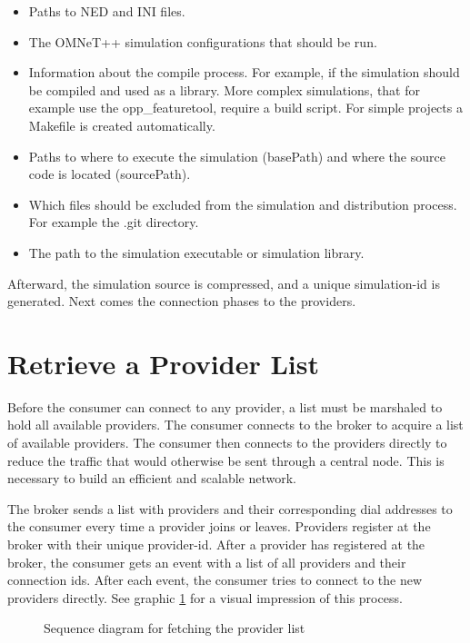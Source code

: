 \begin{itemize}
    \item Paths to NED and INI files.
    \item The OMNeT++ simulation configurations that should be run.
    \item Information about the compile process. For example, if the simulation should be compiled and used as a library. More complex simulations, that for example use the opp\_featuretool, require a build script. For simple projects a Makefile is created automatically.
    \item Paths to where to execute the simulation (basePath) and where the source code is located (sourcePath).
    \item Which files should be excluded from the simulation and distribution process. For example the .git directory.
    \item The path to the simulation executable or simulation library.
\end{itemize}

Afterward, the simulation source is compressed, and a unique simulation-id is generated. Next comes the connection phases to the providers.

\section{Retrieve a Provider List}

Before the consumer can connect to any provider, a list must be marshaled to hold all available providers. The consumer connects to the broker to acquire a list of available providers. The consumer then connects to the providers directly to reduce the traffic that would otherwise be sent through a central node. This is necessary to build an efficient and scalable network.

The broker sends a list with providers and their corresponding dial addresses to the consumer every time a provider joins or leaves. Providers register at the broker with their unique provider-id. After a provider has registered at the broker, the consumer gets an event with a list of all providers and their connection ids. After each event, the consumer tries to connect to the new providers directly. See graphic \ref{fig:sequence-connect} for a visual impression of this process.

\begin{figure}
  \centering
  
  \caption{Sequence diagram for fetching the provider list}
  \label{fig:sequence-connect}
\end{figure}

